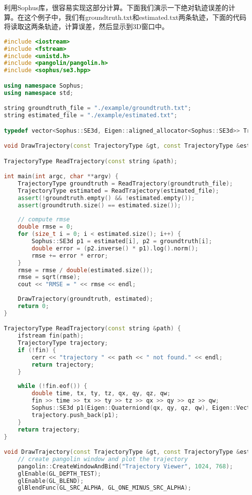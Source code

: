 利用Sophus库，很容易实现这部分计算。下面我们演示一下绝对轨迹误差的计算。在这个例子中，我们有groundtruth.txt和estimated.txt两条轨迹，下面的代码将读取这两条轨迹，计算误差，然后显示到3D窗口中。
\begin{lstlisting}[language=c++,caption=slambook/ch4/example/trajectoryError.cpp]
#include <iostream>
#include <fstream>
#include <unistd.h>
#include <pangolin/pangolin.h>
#include <sophus/se3.hpp>

using namespace Sophus;
using namespace std;

string groundtruth_file = "./example/groundtruth.txt";
string estimated_file = "./example/estimated.txt";

typedef vector<Sophus::SE3d, Eigen::aligned_allocator<Sophus::SE3d>> TrajectoryType;

void DrawTrajectory(const TrajectoryType &gt, const TrajectoryType &esti);

TrajectoryType ReadTrajectory(const string &path);

int main(int argc, char **argv) {
	TrajectoryType groundtruth = ReadTrajectory(groundtruth_file);
	TrajectoryType estimated = ReadTrajectory(estimated_file);
	assert(!groundtruth.empty() && !estimated.empty());
	assert(groundtruth.size() == estimated.size());
	
	// compute rmse
	double rmse = 0;
	for (size_t i = 0; i < estimated.size(); i++) {
		Sophus::SE3d p1 = estimated[i], p2 = groundtruth[i];
		double error = (p2.inverse() * p1).log().norm();
		rmse += error * error;
	}
	rmse = rmse / double(estimated.size());
	rmse = sqrt(rmse);
	cout << "RMSE = " << rmse << endl;
	
	DrawTrajectory(groundtruth, estimated);
	return 0;
}

TrajectoryType ReadTrajectory(const string &path) {
	ifstream fin(path);
	TrajectoryType trajectory;
	if (!fin) {
		cerr << "trajectory " << path << " not found." << endl;
		return trajectory;
	}
	
	while (!fin.eof()) {
		double time, tx, ty, tz, qx, qy, qz, qw;
		fin >> time >> tx >> ty >> tz >> qx >> qy >> qz >> qw;
		Sophus::SE3d p1(Eigen::Quaterniond(qx, qy, qz, qw), Eigen::Vector3d(tx, ty, tz));
		trajectory.push_back(p1);
	}
	return trajectory;
}

void DrawTrajectory(const TrajectoryType &gt, const TrajectoryType &esti) {
	// create pangolin window and plot the trajectory
	pangolin::CreateWindowAndBind("Trajectory Viewer", 1024, 768);
	glEnable(GL_DEPTH_TEST);
	glEnable(GL_BLEND);
	glBlendFunc(GL_SRC_ALPHA, GL_ONE_MINUS_SRC_ALPHA);
	

\end{lstlisting}
